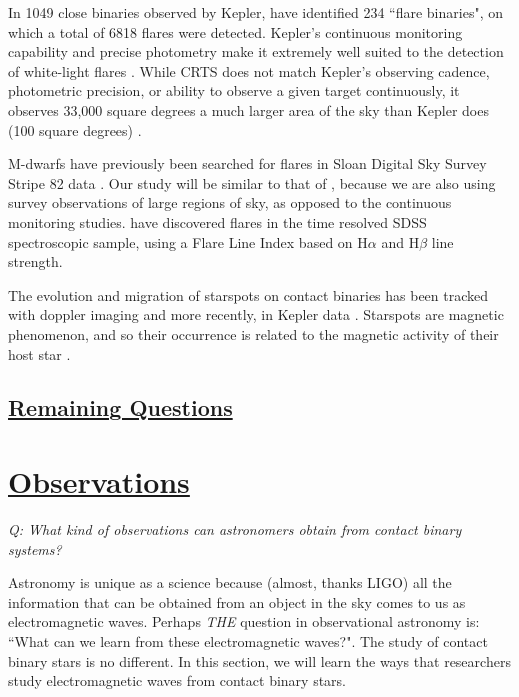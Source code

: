 \documentclass[12pt]{article} %
\numberwithin{equation}{section} %
\begin{document}
In 1049 close binaries observed by Kepler, \citet{gao2016white} have identified 234 ``flare binaries", on which a total of 6818 flares were detected. Kepler's continuous monitoring capability and precise photometry make it extremely well suited to the detection of white-light flares \citep{walkowicz2011white}. While CRTS does not match Kepler's observing cadence, photometric precision, or ability to observe a given target continuously, it observes 33,000 square degrees a much larger area of the sky than Kepler does (100 square degrees) \citep{drake2009first, basri2005kepler}.

M-dwarfs have previously been searched for flares in Sloan Digital Sky Survey Stripe 82 data \citep{kowalski2009m}. Our study will be similar to that of \citet{kowalski2009m}, because we are also using survey observations of large regions of sky, as opposed to the continuous monitoring studies. \citet{hilton2010m} have discovered flares in the time resolved SDSS spectroscopic sample, using a Flare Line Index based on H$\alpha$ and H$\beta$ line strength.

The evolution and migration of starspots on contact binaries has been tracked with doppler imaging \citep{hendry2000doppler} and more recently, in Kepler data \citep{tran2013anticorrelated, balaji2015tracking}. Starspots are magnetic phenomenon, and so their occurrence is related to the magnetic activity of their host star \citep{berdyugina2005starspots}.  

\subsection[Remaining Questions]{\hyperlink{toc}{Remaining Questions}} \label{sec: Remaining Questions}

\section[Observations]{\hyperlink{toc}{Observations}} \label{sec: observations}

\emph{Q: What kind of observations can astronomers obtain from contact binary systems?}

Astronomy is unique as a science because (almost, thanks LIGO) all the information that can be obtained from an object in the sky comes to us as electromagnetic waves. Perhaps \emph{THE} question in observational astronomy is: ``What can we learn from these electromagnetic waves?". The study of contact binary stars is no different. In this section, we will learn the ways that researchers study electromagnetic waves from contact binary stars.
\end{document}
